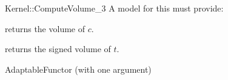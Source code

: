 \begin{ccRefFunctionObjectConcept}{Kernel::ComputeVolume_3}
A model for this must provide:


       {returns the volume of $c$. }

       {returns the signed volume of $t$. }

\ccRefines
AdaptableFunctor (with one argument)

\ccSeeAlso

 \\
 \\

\end{ccRefFunctionObjectConcept}
